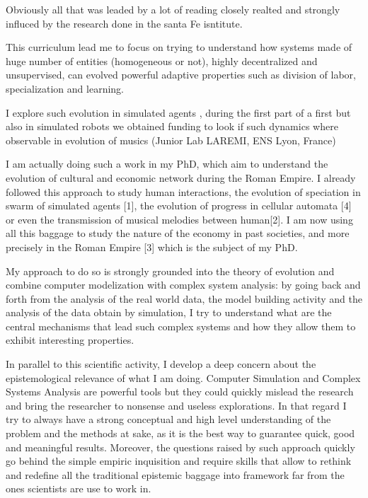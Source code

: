 \documentclass[10pt]{paper}
\begin{document}
Obviously all that was leaded by a lot of reading closely realted and strongly influced by the research done in the santa Fe isntitute. 

This curriculum lead me to focus on trying to understand how systems made of huge number of entities (homogeneous or not), highly decentralized and unsupervised, can evolved powerful adaptive properties such as division of labor, specialization and learning.

I explore such evolution in simulated agents , during the first part of a first but also in simulated robots we obtained funding to look if such dynamics where observable in evolution of musics (Junior Lab LAREMI, ENS Lyon, France)

I am actually doing such a work in my PhD, which aim to understand the evolution of cultural and economic network during the Roman Empire. 
I already followed this approach to study human interactions, the evolution of speciation in swarm of simulated agents [1], the evolution of progress in cellular automata [4] or even the transmission of musical melodies between human[2]. I am now using all this baggage to study the nature of the economy in past societies, and more precisely in the Roman Empire [3] which is the subject of my PhD. 

My approach to do so is strongly grounded into the theory of evolution and combine computer modelization with complex system analysis: by going back and forth from the analysis of the real world data, the model building activity and the analysis of the data obtain by simulation, I try to understand what are the central mechanisms that lead such complex systems and how they allow them to exhibit interesting properties. 

In parallel to this scientific activity, I develop a deep concern about the epistemological relevance of what I am doing. Computer Simulation and Complex Systems Analysis are powerful tools but they could quickly mislead the research and bring the researcher to nonsense and useless explorations. In that regard I try to always have a strong conceptual and high level understanding of the problem and the methods at sake, as it is the best way to guarantee quick, good and meaningful results. Moreover, the questions raised by such approach quickly go behind the simple empiric inquisition and require skills that allow to rethink and redefine all the traditional epistemic baggage into framework far from the ones scientists are use to work in.
\end{document}
